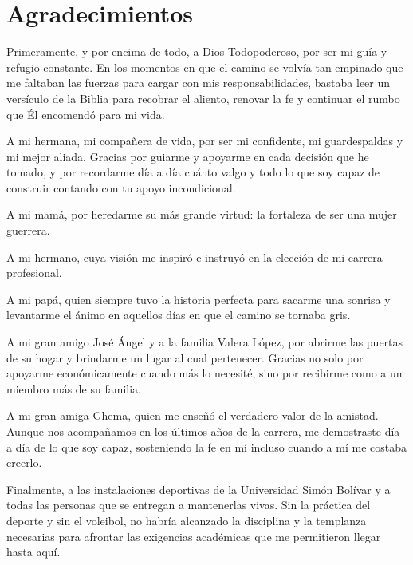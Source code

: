 \chapter*{Agradecimientos}

\par Primeramente, y por encima de todo, a Dios Todopoderoso, por ser mi guía y refugio constante. En los momentos en que el camino se volvía tan empinado que me faltaban las fuerzas para cargar con mis responsabilidades, bastaba leer un versículo de la Biblia para recobrar el aliento, renovar la fe y continuar el rumbo que Él encomendó para mi vida.\\

\par A mi hermana, mi compañera de vida, por ser mi confidente, mi guardespaldas y mi mejor aliada. Gracias por guiarme y apoyarme en cada decisión que he tomado, y por recordarme día a día cuánto valgo y todo lo que soy capaz de construir contando con tu apoyo incondicional.\\

\par A mi mamá, por heredarme su más grande virtud: la fortaleza de ser una mujer guerrera.\\

\par A mi hermano, cuya visión me inspiró e instruyó en la elección de mi carrera profesional.\\

\par A mi papá, quien siempre tuvo la historia perfecta para sacarme una sonrisa y levantarme el ánimo en aquellos días en que el camino se tornaba gris.\\

\par A mi gran amigo José Ángel y a la familia Valera López, por abrirme las puertas de su hogar y brindarme un lugar al cual pertenecer. Gracias no solo por apoyarme económicamente cuando más lo necesité, sino por recibirme como a un miembro más de su familia.\\

\par A mi gran amiga Ghema, quien me enseñó el verdadero valor de la amistad. Aunque nos acompañamos en los últimos años de la carrera, me demostraste día a día de lo que soy capaz, sosteniendo la fe en mí incluso cuando a mí me costaba creerlo.\\

\par Finalmente, a las instalaciones deportivas de la Universidad Simón Bolívar y a todas las personas que se entregan a mantenerlas vivas. Sin la práctica del deporte y sin el voleibol, no habría alcanzado la disciplina y la templanza necesarias para afrontar las exigencias académicas que me permitieron llegar hasta aquí.\\

